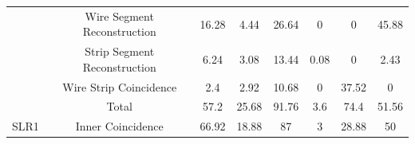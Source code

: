 \begin{table}[]
\begin{tabular}{|c|c|c|c|c|c|c|c|}
                                                                                & Wire Segment Reconstruction  & 16.28                                                     & 4.44                                                      & 26.64                                                    & 0                                                                 & 0                                                      & 45.88                                                  \\ \cline{2-8} 
                                                                                & Strip Segment Reconstruction & 6.24                                                      & 3.08                                                      & 13.44                                                    & 0.08                                                              & 0                                                      & 2.43                                                   \\ \cline{2-8} 
                                                                                & Wire Strip Coincidence       & 2.4                                                       & 2.92                                                      & 10.68                                                    & 0                                                                 & 37.52                                                  & 0                                                      \\ \cline{2-8} 
                                                                                & Total                        & 57.2                                                      & 25.68                                                     & 91.76                                                    & 3.6                                                               & 74.4                                                   & 51.56                                                  \\ \hline\hline
    \multirow{3}{*}{SLR1}                                                       & Inner Coincidence            & 66.92                                                     & 18.88                                                     & 87                                                       & 3                                                                 & 28.88                                                  & 50                                                     \\ \cline{2-8} 

\end{tabular}
\end{table}
